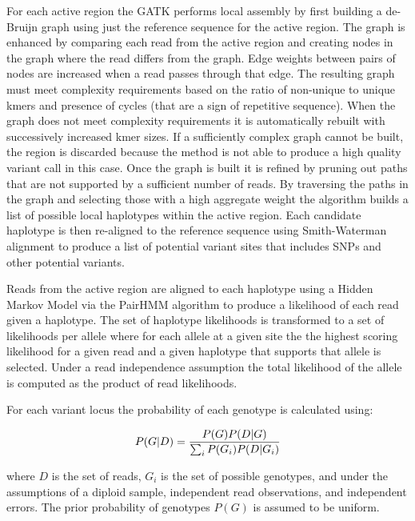 For each active region the GATK performs local assembly by first building a de-Bruijn graph\autocite{compeau2011apply} using just the reference sequence for the active region. The graph is enhanced by comparing each read from the active region and creating nodes in the graph where the read differs from the graph. Edge weights between pairs of nodes are increased when a read passes through that edge. The resulting graph must meet complexity requirements based on the ratio of non-unique to unique kmers and presence of cycles (that are a sign of repetitive sequence). When the graph does not meet complexity requirements it is automatically rebuilt with successively increased kmer sizes. If a sufficiently complex graph cannot be built, the region is discarded because the method is not able to produce a high quality variant call in this case. Once the graph is built it is refined by pruning out paths that are not supported by a sufficient number of reads. By traversing the paths in the graph and selecting those with a high aggregate weight the algorithm builds a list of possible local haplotypes within the active region. Each candidate haplotype is then re-aligned to the reference sequence using Smith-Waterman\autocite{smith1981comparison} alignment to produce a list of potential variant sites that includes SNPs and other potential variants.

Reads from the active region are aligned to each haplotype using a Hidden Markov Model via the PairHMM algorithm\autocite{durbin1998biological} to produce a likelihood of each read given a haplotype. The set of haplotype likelihoods is transformed to a set of likelihoods per allele where for each allele at a given site the the highest scoring likelihood for a given read and a given haplotype that supports that allele is selected. Under a read independence assumption the total likelihood of the allele is computed as the product of read likelihoods.

For each variant locus the probability of each genotype is calculated using:

\begin{equation}
    \label{eq:gatk_genotyping}
P(G|D) = {P(G)P(D|G)\over\sum_i P(G_i)P(D|G_i)}
\end{equation}

where $D$ is the set of reads, $G_i$ is the set of possible genotypes, and under the assumptions of a diploid sample, independent read observations, and independent errors. The prior probability of genotypes $P(G)$ is assumed to be uniform. 

